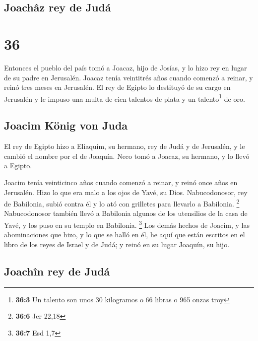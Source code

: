 \hypertarget{joachuxe2z-rey-de-juduxe1}{%
\subsection{Joachâz rey de Judá}\label{joachuxe2z-rey-de-juduxe1}}

\hypertarget{section-35}{%
\section{36}\label{section-35}}

 Entonces el pueblo del país tomó a Joacaz, hijo de
Josías, y lo hizo rey en lugar de su padre en Jerusalén. 
Joacaz tenía veintitrés años cuando comenzó a reinar, y reinó tres meses
en Jerusalén.  El rey de Egipto lo destituyó de su cargo
en Jerusalén y le impuso una multa de cien talentos de plata y un
talento\footnote{\textbf{36:3} Un talento son unos 30 kilogramos o 66
  libras o 965 onzas troy} de oro.

\hypertarget{joacim-kuxf6nig-von-juda}{%
\subsection{Joacim König von Juda}\label{joacim-kuxf6nig-von-juda}}

 El rey de Egipto hizo a Eliaquim, su hermano, rey de Judá
y de Jerusalén, y le cambió el nombre por el de Joaquín. Neco tomó a
Joacaz, su hermano, y lo llevó a Egipto.

 Joacim tenía veinticinco años cuando comenzó a reinar, y
reinó once años en Jerusalén. Hizo lo que era malo a los ojos de Yavé,
su Dios.  Nabucodonosor, rey de Babilonia, subió contra él
y lo ató con grilletes para llevarlo a Babilonia. \footnote{\textbf{36:6}
  Jer 22,18}  Nabucodonosor también llevó a Babilonia
algunos de los utensilios de la casa de Yavé, y los puso en su templo en
Babilonia. \footnote{\textbf{36:7} Esd 1,7}  Los demás
hechos de Joacim, y las abominaciones que hizo, y lo que se halló en él,
he aquí que están escritos en el libro de los reyes de Israel y de Judá;
y reinó en su lugar Joaquín, su hijo.

\hypertarget{joachuxeen-rey-de-juduxe1}{%
\subsection{Joachîn rey de Judá}\label{joachuxeen-rey-de-juduxe1}}

